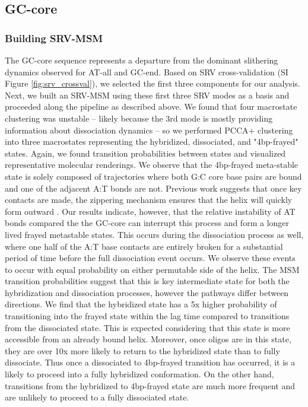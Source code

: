 \documentclass[journal=jpcbfk,manuscript=article]{achemso}
\begin{document}

\subsection{GC-core}

\subsubsection{Building SRV-MSM}

The GC-core sequence represents a departure from the dominant slithering dynamics observed for AT-all and GC-end. Based on SRV cross-validation (SI Figure \ref{fig:srv_crossval}), we selected the first three components for our analysis. Next, we built an SRV-MSM using these first three SRV modes as a basis and proceeded along the pipeline as described above. We found that four macrostate clustering was unstable -- likely because the 3rd mode is mostly providing  information about dissociation dynamics -- so we performed PCCA+ clustering into three macrostates representing the hybridized, dissociated, and "4bp-frayed" states. Again, we found transition probabilities between states and visualized representative molecular renderings. We observe that the 4bp-frayed meta-stable state is solely composed of trajectories where both G:C core base pairs are bound and one of the adjacent A:T bonds are not. Previous work suggests that once key contacts are made, the zippering mechanism ensures that the helix will quickly form outward \citep{Romano2013DNADependence, Yin2011KineticsHybridization}. Our results indicate, however, that the relative instability of AT bonds compared the the GC-core can interrupt this process and form a longer lived frayed metastable states. This occurs during the dissociation process as well, where one half of the A:T base contacts are entirely broken for a substantial period of time before the full dissociation event occurs. We observe these events to occur with equal probability on either permutable side of the helix. The MSM transition probabilities suggest that this is key intermediate state for both the hybridization and dissociation processes, however the pathways differ between directions. We find that the hybridized state has a 5x higher probability of transitioning into the frayed state within the lag time compared to transitions from the dissociated state. This is expected considering that this state is more accessible from an already bound helix. Moreover, once oligos are in this state, they are over 10x more likely to return to the hybridized state than to fully dissociate. Thus once a dissociated to 4bp-frayed transition has occurred, it is a likely to proceed into a fully hybridized conformation. On the other hand, transitions from the hybridized to 4bp-frayed state are much more frequent and are unlikely to proceed to a fully dissociated state.
\end{document}
